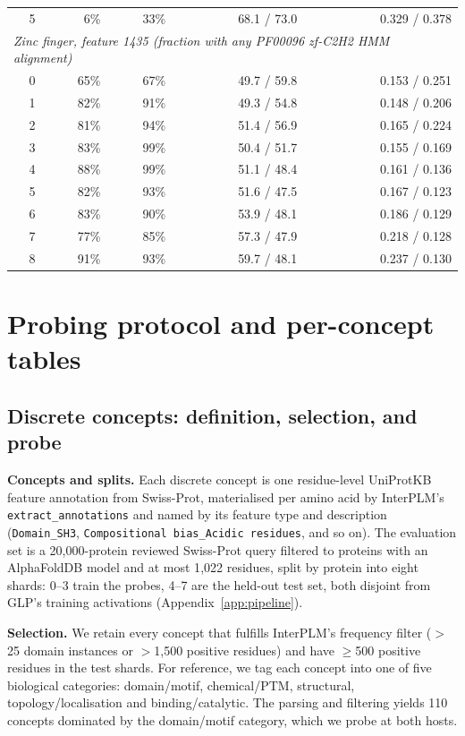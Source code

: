 \documentclass{article}
\begin{document}
\begin{table}[h]
\begin{tabular}{rrrrr}
5 & 6\% & 33\% & 68.1 / 73.0 & 0.329 / 0.378 \\
\cmidrule(lr){1-5}
\multicolumn{5}{l}{\textit{Zinc finger, feature 1435 (fraction with any PF00096 zf-C2H2 HMM alignment)}} \\
0 & 65\% & 67\% & 49.7 / 59.8 & 0.153 / 0.251 \\
1 & 82\% & 91\% & 49.3 / 54.8 & 0.148 / 0.206 \\
2 & 81\% & 94\% & 51.4 / 56.9 & 0.165 / 0.224 \\
3 & 83\% & 99\% & 50.4 / 51.7 & 0.155 / 0.169 \\
4 & 88\% & 99\% & 51.1 / 48.4 & 0.161 / 0.136 \\
5 & 82\% & 93\% & 51.6 / 47.5 & 0.167 / 0.123 \\
6 & 83\% & 90\% & 53.9 / 48.1 & 0.186 / 0.129 \\
7 & 77\% & 85\% & 57.3 / 47.9 & 0.218 / 0.128 \\
8 & 91\% & 93\% & 59.7 / 48.1 & 0.237 / 0.130 \\
\bottomrule
\end{tabular}
\end{table}

\section{Probing protocol and per-concept tables}
\label{app:tables}

\subsection{Discrete concepts: definition, selection, and probe}
\label{app:probe-discrete}

\textbf{Concepts and splits.} Each discrete concept is one residue-level UniProtKB feature
annotation from Swiss-Prot, materialised per amino acid by InterPLM's
\texttt{extract\_annotations} and named by its feature type and description
(\texttt{Domain\_SH3}, \texttt{Compositional bias\_Acidic residues}, and so on). The evaluation set is a
20{,}000-protein reviewed Swiss-Prot query filtered to proteins with an AlphaFoldDB model and at
most 1{,}022 residues, split by protein into eight shards: 0--3 train the probes, 4--7 are the
held-out test set, both disjoint from GLP's training activations (Appendix~\ref{app:pipeline}).

\textbf{Selection.} We retain every concept that fulfills InterPLM's
frequency filter ($>$25 domain instances or $>$1{,}500 positive residues) and have $\ge$500
positive residues in the test shards. For reference, we tag each concept into one of five biological categories: domain/motif, chemical/PTM, structural, topology/localisation and binding/catalytic. The parsing and filtering yields 110 concepts dominated
by the domain/motif category, which we probe at both hosts.
\end{document}
